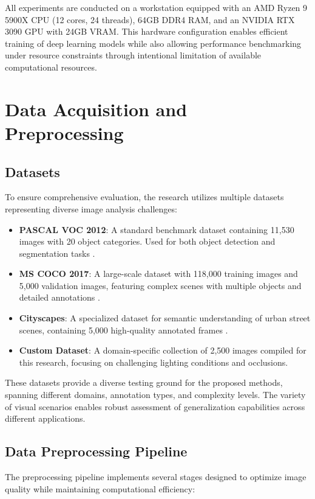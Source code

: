 All experiments are conducted on a workstation equipped with an AMD Ryzen 9 5900X CPU (12 cores, 24 threads), 64GB DDR4 RAM, and an NVIDIA RTX 3090 GPU with 24GB VRAM. This hardware configuration enables efficient training of deep learning models while also allowing performance benchmarking under resource constraints through intentional limitation of available computational resources.

\section{Data Acquisition and Preprocessing}

\subsection{Datasets}
To ensure comprehensive evaluation, the research utilizes multiple datasets representing diverse image analysis challenges:

\begin{itemize}
    \item \textbf{PASCAL VOC 2012}: A standard benchmark dataset containing 11,530 images with 20 object categories. Used for both object detection and segmentation tasks \cite{everingham2010pascal}.
    
    \item \textbf{MS COCO 2017}: A large-scale dataset with 118,000 training images and 5,000 validation images, featuring complex scenes with multiple objects and detailed annotations \cite{lin2014microsoft}.
    
    \item \textbf{Cityscapes}: A specialized dataset for semantic understanding of urban street scenes, containing 5,000 high-quality annotated frames \cite{cordts2016cityscapes}.
    
    \item \textbf{Custom Dataset}: A domain-specific collection of 2,500 images compiled for this research, focusing on challenging lighting conditions and occlusions.
\end{itemize}

These datasets provide a diverse testing ground for the proposed methods, spanning different domains, annotation types, and complexity levels. The variety of visual scenarios enables robust assessment of generalization capabilities across different applications.

\subsection{Data Preprocessing Pipeline}
The preprocessing pipeline implements several stages designed to optimize image quality while maintaining computational efficiency:

